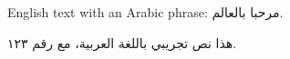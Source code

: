 \documentclass{article}
\begin{document}
English text with an Arabic phrase: \textarabic{مرحبا بالعالم}.
\begin{Arabic}
هذا نص تجريبي باللغة العربية، مع رقم ١٢٣.
\end{Arabic}
\end{document}
